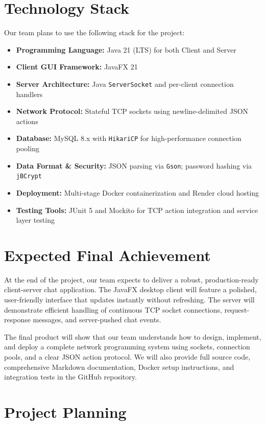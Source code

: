 \documentclass[11pt]{article}
\begin{document}
\section{Technology Stack}

Our team plans to use the following stack for the project:

\begin{itemize}
    \item \textbf{Programming Language:} Java 21 (LTS) for both Client and Server
    \item \textbf{Client GUI Framework:} JavaFX 21
    \item \textbf{Server Architecture:} Java \texttt{ServerSocket} and per-client connection handlers
    \item \textbf{Network Protocol:} Stateful TCP sockets using newline-delimited JSON actions
    \item \textbf{Database:} MySQL 8.x with \texttt{HikariCP} for high-performance connection pooling
    \item \textbf{Data Format \& Security:} JSON parsing via \texttt{Gson}; password hashing via \texttt{jBCrypt}
    \item \textbf{Deployment:} Multi-stage Docker containerization and Render cloud hosting
    \item \textbf{Testing Tools:} JUnit 5 and Mockito for TCP action integration and service layer testing
\end{itemize}

\section{Expected Final Achievement}

At the end of the project, our team expects to deliver a robust, production-ready client-server chat application. The JavaFX desktop client will feature a polished, user-friendly interface that updates instantly without refreshing. The server will demonstrate efficient handling of continuous TCP socket connections, request-response messages, and server-pushed chat events.

The final product will show that our team understands how to design, implement, and deploy a complete network programming system using sockets, connection pools, and a clear JSON action protocol. We will also provide full source code, comprehensive Markdown documentation, Docker setup instructions, and integration tests in the GitHub repository.

\section{Project Planning}
\end{document}
